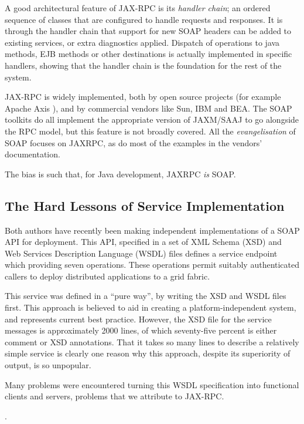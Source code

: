 A good architectural feature of JAX-RPC is its \emph{handler chain}; an
ordered sequence of classes that are configured to handle requests and
responses. It is through the handler chain that support for new SOAP
headers can be added to existing services, or extra diagnostics applied.
Dispatch of operations to java methods, EJB methods or other
destinations is actually implemented in specific handlers, showing that
the handler chain is the foundation for the rest of the system.

JAX-RPC is widely implemented, both by open
source projects (for example Apache Axis \cite{apache:axis}), and by
commercial vendors like Sun, IBM and BEA. The SOAP toolkits do all
implement the appropriate version of JAXM/SAAJ to go alongside the RPC
model, but this feature is not broadly covered. All the
\emph{evangelisation} of SOAP focuses on JAXRPC, as do most of the
examples in the vendors' documentation.

The bias is such that, for Java development, JAXRPC \emph{is} SOAP. 

\subsection{The Hard Lessons of Service Implementation}
\label{intro:experience}

Both authors have recently been making independent implementations of
a SOAP API for deployment. This API, specified in a set of XML Schema
(XSD) \cite{spec:XSD} and Web Services Description Language (WSDL)
files \cite{spec:WSDL-11} defines a service endpoint which providing
seven operations. These operations permit suitably authenticated
callers to deploy distributed applications to a grid fabric.

This service was defined in a ``pure way'', by writing the XSD and
WSDL files first. This approach is believed to aid in
creating a platform-independent system, and represents current best
practice. However, the XSD file for the service messages is
approximately 2000 lines, of which seventy-five percent is either
comment or XSD annotations. That it takes so many lines to describe a
relatively simple service is clearly one reason why this approach,
despite its superiority of output, is so unpopular. 

Many problems were encountered turning this WSDL specification into
functional clients and servers, problems that we attribute to JAX-RPC.

.



